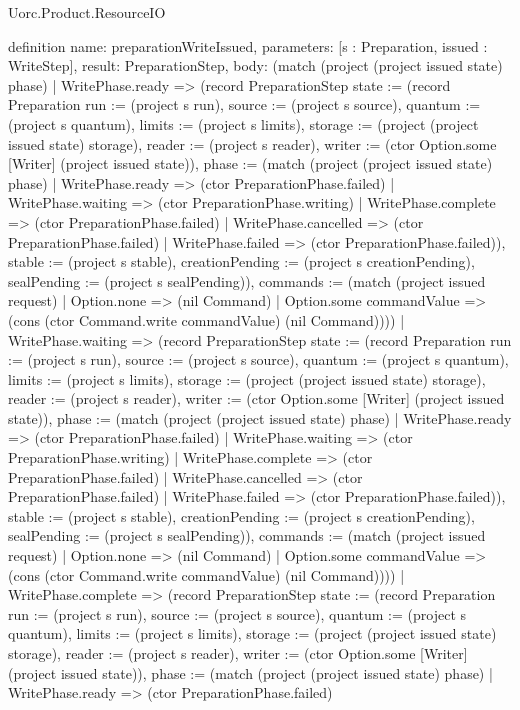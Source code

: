 \begin{lexlean}{Uorc.Product.ResourceIO}
\begin{semanticmodule}
definition{
  name: preparationWriteIssued,
  parameters: [s : Preparation, issued : WriteStep],
  result: PreparationStep,
  body: (match (project (project issued state) phase)
    | WritePhase.ready => (record PreparationStep {state := (record Preparation {run := (project s run), source := (project s source), quantum := (project s quantum), limits := (project s limits), storage := (project (project issued state) storage), reader := (project s reader), writer := (ctor Option.some [Writer] (project issued state)), phase := (match (project (project issued state) phase)
      | WritePhase.ready => (ctor PreparationPhase.failed)
      | WritePhase.waiting => (ctor PreparationPhase.writing)
      | WritePhase.complete => (ctor PreparationPhase.failed)
      | WritePhase.cancelled => (ctor PreparationPhase.failed)
      | WritePhase.failed => (ctor PreparationPhase.failed)), stable := (project s stable), creationPending := (project s creationPending), sealPending := (project s sealPending)}), commands := (match (project issued request)
      | Option.none => (nil Command)
      | Option.some commandValue => (cons (ctor Command.write commandValue) (nil Command)))})
    | WritePhase.waiting => (record PreparationStep {state := (record Preparation {run := (project s run), source := (project s source), quantum := (project s quantum), limits := (project s limits), storage := (project (project issued state) storage), reader := (project s reader), writer := (ctor Option.some [Writer] (project issued state)), phase := (match (project (project issued state) phase)
      | WritePhase.ready => (ctor PreparationPhase.failed)
      | WritePhase.waiting => (ctor PreparationPhase.writing)
      | WritePhase.complete => (ctor PreparationPhase.failed)
      | WritePhase.cancelled => (ctor PreparationPhase.failed)
      | WritePhase.failed => (ctor PreparationPhase.failed)), stable := (project s stable), creationPending := (project s creationPending), sealPending := (project s sealPending)}), commands := (match (project issued request)
      | Option.none => (nil Command)
      | Option.some commandValue => (cons (ctor Command.write commandValue) (nil Command)))})
    | WritePhase.complete => (record PreparationStep {state := (record Preparation {run := (project s run), source := (project s source), quantum := (project s quantum), limits := (project s limits), storage := (project (project issued state) storage), reader := (project s reader), writer := (ctor Option.some [Writer] (project issued state)), phase := (match (project (project issued state) phase)
      | WritePhase.ready => (ctor PreparationPhase.failed)
}}}
\end{semanticmodule}
\end{lexlean}
